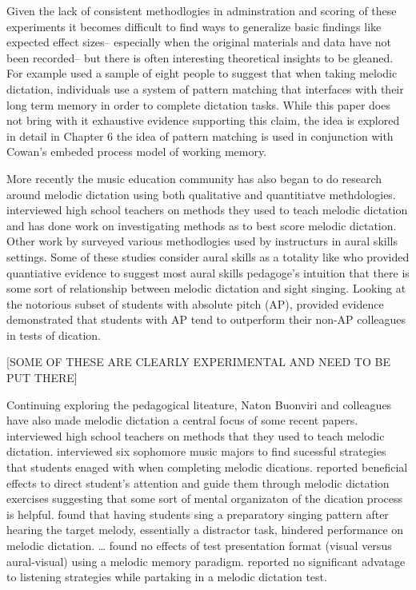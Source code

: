 \documentclass[]{book}
\begin{document}
Given the lack of consistent methodlogies in adminstration and scoring of these experiments it becomes difficult to find ways to generalize basic findings like expected effect sizes-- especially when the original materials and data have not been recorded-- but there is often interesting theoretical insights to be gleaned.
For example \citep{ouraConstructingRepresentationMelody1991a} used a sample of eight people to suggest that when taking melodic dictation, individuals use a system of pattern matching that interfaces with their long term memory in order to complete dictation tasks.
While this paper does not bring with it exhaustive evidence supporting this claim, the idea is explored in detail in Chapter 6 the idea of pattern matching is used in conjunction with Cowan's embeded process model of working memory.

More recently the music education community has also began to do research around melodic dictation using both qualitative and quantitiatve methdologies.
\citep{paneyTeachingMelodicDictation2014} interviewed high school teachers on methods they used to teach melodic dictation and \citep{gillespieMelodicDictationScoring2001} has done work on investigating methods as to best score melodic dictation.
Other work by \citep{pembrookSendHelpAural1990} surveyed various methodlogies used by instructurs in aural skills settings.
Some of these studies consider aural skills as a totality like
\citep{norrisRelationshipSightSinging2003} who provided quantiative evidence to suggest most aural skills pedagoge's intuition that there is some sort of relationship between melodic dictation and sight singing.
Looking at the notorious subset of students with absolute pitch (AP), \citep{dooleyAbsolutePitchCorrelates2010} provided evidence demonstrated that students with AP tend to outperform their non-AP colleagues in tests of dication.

{[}SOME OF THESE ARE CLEARLY EXPERIMENTAL AND NEED TO BE PUT THERE{]}

Continuing exploring the pedagogical liteature, Naton Buonviri and colleagues have also made melodic dictation a central focus of some recent papers.
\citet{paneyTeachingMelodicDictation2014} interviewed high school teachers on methods that they used to teach melodic dictation.
\citet{buonviriEffectsMusicNotation2015} interviewed six sophomore music majors to find sucessful strategies that students enaged with when completing melodic dications.
\citet{paneyEffectDirectingAttention2016} reported beneficial effects to direct student's attention and guide them through melodic dictation exercises suggesting that some sort of mental organizaton of the dication process is helpful.
\citet{buonviriMelodicDictationInstruction2015} found that having students sing a preparatory singing pattern after hearing the target melody, essentially a distractor task, hindered performance on melodic dictation.
\citet{buonviriEffectsPreparatorySinging2015}\ldots{}
\citet{buonviriEffectsMusicNotation2015} found no effects of test presentation format (visual versus aural-visual) using a melodic memory paradigm.
\citet{buonviriEffectsTwoListening2017} reported no significant advatage to listening strategies while partaking in a melodic dictation test.
\end{document}
